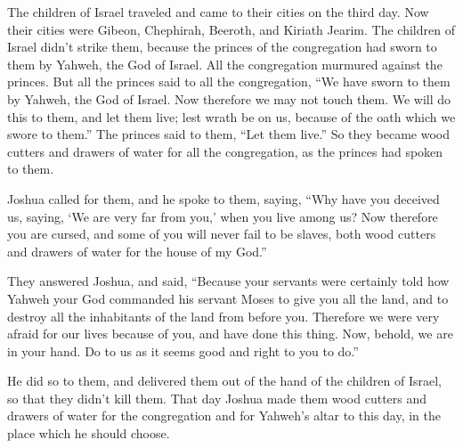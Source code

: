 {The children of Israel traveled and came to their cities on the third day. Now their cities were Gibeon, Chephirah, Beeroth, and Kiriath Jearim.
The children of Israel didn’t strike them, because the princes of the congregation had sworn to them by Yahweh, the God of Israel. All the congregation murmured against the princes.
But all the princes said to all the congregation, “We have sworn to them by Yahweh, the God of Israel. Now therefore we may not touch them.
We will do this to them, and let them live; lest wrath be on us, because of the oath which we swore to them.”
The princes said to them, “Let them live.” So they became wood cutters and drawers of water for all the congregation, as the princes had spoken to them.
\par }{\PP {}Joshua called for them, and he spoke to them, saying, “Why have you deceived us, saying, ‘We are very far from you,’ when you live among us?
Now therefore you are cursed, and some of you will never fail to be slaves, both wood cutters and drawers of water for the house of my God.”
\par }{\PP {}They answered Joshua, and said, “Because your servants were certainly told how Yahweh your God commanded his servant Moses to give you all the land, and to destroy all the inhabitants of the land from before you. Therefore we were very afraid for our lives because of you, and have done this thing.
Now, behold, we are in your hand. Do to us as it seems good and right to you to do.”
\par }{\PP {}He did so to them, and delivered them out of the hand of the children of Israel, so that they didn’t kill them.
That day Joshua made them wood cutters and drawers of water for the congregation and for Yahweh’s altar to this day, in the place which he should choose.

}
